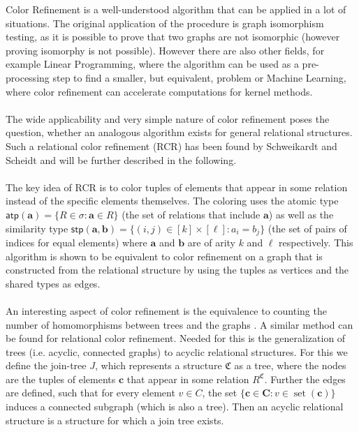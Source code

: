 \documentclass[a4paper,11pt,DIV=15]{scrartcl} %
\theoremstyle{plain}
\theoremstyle{definition}
\begin{document}
Color Refinement is a well-understood algorithm that can be applied in a lot of situations.
The original application of the procedure is graph isomorphism testing, as it is possible to prove that two graphs are not isomorphic (however proving isomorphy is not possible).
However there are also other fields, for example Linear Programming, where the algorithm can be used as a pre-processing step to find a smaller, but equivalent, problem or Machine Learning, where color refinement can accelerate computations for kernel methods. \cite{grohe2021color}
\\ \\
The wide applicability and very simple nature of color refinement poses the question, whether an analogous algorithm exists for general relational structures.
Such a relational color refinement (RCR) has been found by Schweikardt and Scheidt \cite{scheidt2024color} and will be further described in the following.
\\ \\
The key idea of RCR is to color tuples of elements that appear in some relation instead of the specific elements themselves. 
The coloring uses the atomic type $\mathsf{atp}(\mathbf{a})=\{R\in\sigma : \mathbf{a}\in R\}$ (the set of relations that include $\mathbf{a}$) as well as the similarity type $\mathsf{stp}(\mathbf{a},\mathbf{b})=\{(i,j)\in[k]\times[\ell] : a_i=b_j\}$ (the set of pairs of indices for equal elements) where $\mathbf{a}$ and $\mathbf{b}$ are of arity $k$ and $\ell$ respectively.
This algorithm is shown to be equivalent to color refinement on a graph that is constructed from the relational structure by using the tuples as vertices and the shared types as edges.
\\ \\
An interesting aspect of color refinement is the equivalence to counting the number of homomorphisms between trees and the graphs \cite{dvovrak2010recognizing}. A similar method can be found for relational color refinement.
Needed for this is the generalization of trees (i.e. acyclic, connected graphs) to acyclic relational structures.
For this we define the join-tree $J$, which represents a structure $\mathfrak C$ as a tree, where the nodes are the tuples of elements $\mathbf c$ that appear in some relation $R^\mathfrak C$. Further the edges are defined, such that for every element $v\in C$, the set $\{\mathbf{c}\in \mathbf{C} : v\in\operatorname{set}(\mathbf c)\}$ induces a connected subgraph (which is also a tree).
Then an acyclic relational structure is a structure for which a join tree exists.
\end{document}
